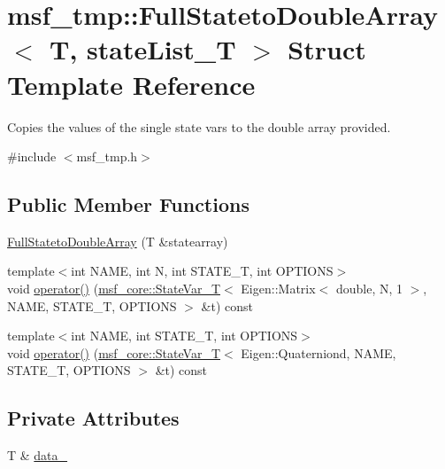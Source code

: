 \hypertarget{structmsf__tmp_1_1FullStatetoDoubleArray}{\section{msf\-\_\-tmp\-:\-:Full\-Stateto\-Double\-Array$<$ T, state\-List\-\_\-\-T $>$ Struct Template Reference}
\label{structmsf__tmp_1_1FullStatetoDoubleArray}
}


Copies the values of the single state vars to the double array provided.  




{\ttfamily \#include $<$msf\-\_\-tmp.\-h$>$}

\subsection*{Public Member Functions}
\begin{DoxyCompactItemize}
\item 
\hyperlink{structmsf__tmp_1_1FullStatetoDoubleArray_a50347ec2470ab4fdd050d9f0c49c7619}{Full\-Stateto\-Double\-Array} (T \&statearray)
\item 
{\footnotesize template$<$int N\-A\-M\-E, int N, int S\-T\-A\-T\-E\-\_\-\-T, int O\-P\-T\-I\-O\-N\-S$>$ }\\void \hyperlink{structmsf__tmp_1_1FullStatetoDoubleArray_ab71ebd14ea9ec91f3058fcd235f0f900}{operator()} (\hyperlink{structmsf__core_1_1StateVar__T}{msf\-\_\-core\-::\-State\-Var\-\_\-\-T}$<$ Eigen\-::\-Matrix$<$ double, N, 1 $>$, N\-A\-M\-E, S\-T\-A\-T\-E\-\_\-\-T, O\-P\-T\-I\-O\-N\-S $>$ \&t) const 
\item 
{\footnotesize template$<$int N\-A\-M\-E, int S\-T\-A\-T\-E\-\_\-\-T, int O\-P\-T\-I\-O\-N\-S$>$ }\\void \hyperlink{structmsf__tmp_1_1FullStatetoDoubleArray_afca6650482318e48f51ca2dfc1cb94be}{operator()} (\hyperlink{structmsf__core_1_1StateVar__T}{msf\-\_\-core\-::\-State\-Var\-\_\-\-T}$<$ Eigen\-::\-Quaterniond, N\-A\-M\-E, S\-T\-A\-T\-E\-\_\-\-T, O\-P\-T\-I\-O\-N\-S $>$ \&t) const 
\end{DoxyCompactItemize}
\subsection*{Private Attributes}
\begin{DoxyCompactItemize}
\item 
T \& \hyperlink{structmsf__tmp_1_1FullStatetoDoubleArray_a6fc51890393603ad774e5dde66389be0}{data\-\_\-}
\end{DoxyCompactItemize}


